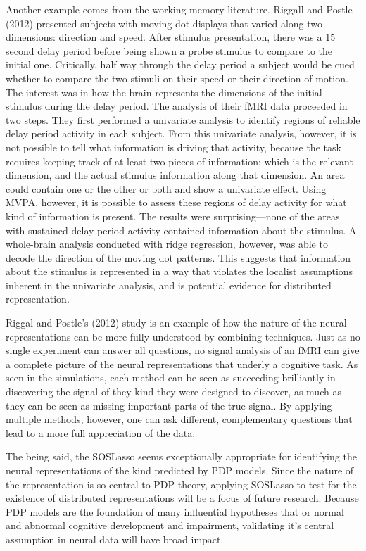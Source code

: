 Another example comes from the working memory literature. Riggall and Postle (2012) presented subjects with moving dot displays that varied along two dimensions: direction and speed. After stimulus presentation, there was a 15 second delay period before being shown a probe stimulus to compare to the initial one. Critically, half way through the delay period a subject would be cued whether to compare the two stimuli on their speed or their direction of motion. The interest was in how the brain represents the dimensions of the initial stimulus during the delay period. The analysis of their fMRI data proceeded in two steps. They first performed a univariate analysis to identify regions of reliable delay period activity in each subject. From this univariate analysis, however, it is not possible to tell what information is driving that activity, because the task requires keeping track of at least two pieces of information: which is the relevant dimension, and the actual stimulus information along that dimension. An area could contain one or the other or both and show a univariate effect. Using MVPA, however, it is possible to assess these regions of delay activity for what kind of information is present. The results were surprising---none of the areas with sustained delay period activity contained information about the stimulus. A whole-brain analysis conducted with ridge regression, however, was able to decode the direction of the moving dot patterns. This suggests that information about the stimulus is represented in a way that violates the localist assumptions inherent in the univariate analysis, and is potential evidence for distributed representation.

Riggal and Postle's (2012) study is an example of how the nature of the neural representations can be more fully understood by combining techniques. Just as no single experiment can answer all questions, no signal analysis of an fMRI can give a complete picture of the neural representations that underly a cognitive task. As seen in the simulations, each method can be seen as succeeding brilliantly in discovering the signal of they kind they were designed to discover, as much as they can be seen as missing important parts of the true signal. By applying multiple methods, however, one can ask different, complementary questions that lead to a more full appreciation of the data.

The being said, the SOSLasso seems exceptionally appropriate for identifying the neural representations of the kind predicted by PDP models. Since the nature of the representation is so central to PDP theory, applying SOSLasso to test for the existence of distributed representations will be a focus of future research. Because PDP models are the foundation of many influential hypotheses that or normal and abnormal cognitive development and impairment, validating it's central assumption in neural data will have broad impact.

